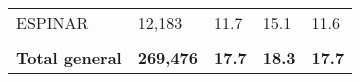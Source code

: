 \begin{tabular}{lllll}
	\cellcolor[HTML]{FF5050}ESPINAR                                & 12,183                                                                & 11.7                                                                             & 15.1                                                                        & 11.6                                                                                \\
	&                                                                       &                                                                                  &                                                                             &                                                                                     \\
	\rowcolor[HTML]{DDEBF7} 
	\textbf{Total   general}                                       & \textbf{269,476}                                                      & \textbf{17.7}                                                                    & \textbf{18.3}                                                               & \textbf{17.7}                                                                      
\end{tabular}